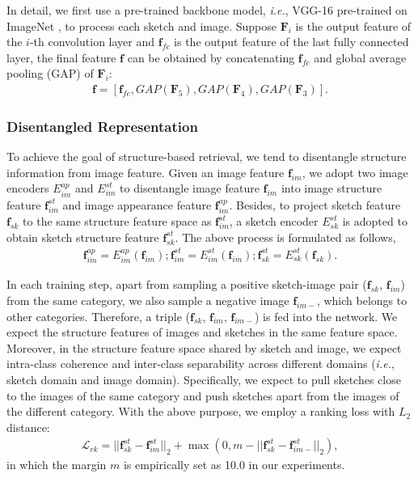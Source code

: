 \documentclass[10pt,twocolumn,letterpaper]{article}
\begin{document}
In detail, we first use a pre-trained backbone model, \emph{i.e.}, VGG-16 pre-trained on ImageNet \cite{deng2009imagenet}, to process each sketch and image. 
Suppose $\mathbf{F}_i$ is the output feature of the $i$-th convolution layer and $\mathbf{f}_{fc}$ is the output feature of the last fully connected layer, the final feature $\mathbf{f}$ can be obtained by concatenating $\mathbf{f}_{fc}$ and global average pooling (GAP) of $\mathbf{F}_i$:
\vspace{-10pt}
\begin{align}
\mathbf{f}\!=\![\mathbf{f}_{fc}, GAP(\mathbf{F}_5), GAP(\mathbf{F}_4), GAP(\mathbf{F}_3)].
\end{align}

\subsubsection{Disentangled Representation}
To achieve the goal of structure-based retrieval, we tend to disentangle structure information from image feature. 
Given an image feature $\mathbf{f}_{im}$, we adopt two image encoders $E_{im}^{ap}$ and $E_{im}^{st}$ to disentangle image feature $\mathbf{f}_{im}$ into image structure feature $\mathbf{f}_{im}^{st}$ and image appearance feature $\mathbf{f}_{im}^{ap}$. Besides, to project sketch feature $\mathbf{f}_{sk}$ to the same structure feature space as $\mathbf{f}_{im}^{st}$, a sketch encoder $E_{sk}^{st}$ is adopted to obtain sketch structure feature $\mathbf{f}_{sk}^{st}$. The above process is formulated as follows,
\vspace{-5pt}
\begin{align}
    \mathbf{f}_{im}^{ap} \!=\! E_{im}^{ap}(\mathbf{f}_{im}); \mathbf{f}_{im}^{st} \!=\! E_{im}^{st}(\mathbf{f}_{im}); \mathbf{f}_{sk}^{st} \!=\! E_{sk}^{st}(\mathbf{f}_{sk}).
\end{align}

In each training step, apart from sampling a positive sketch-image pair ($\mathbf{f}_{sk}$, $\mathbf{f}_{im}$) from the same category, we also sample a negative image $\mathbf{f}_{im-}$, which belongs to other categories. Therefore, a triple ($\mathbf{f}_{sk}$, $\mathbf{f}_{im}$, $\mathbf{f}_{im-}$) is fed into the network. We expect the structure features of images and sketches in the same feature space. Moreover, in the structure feature space shared by sketch and image, we expect intra-class coherence and inter-class separability across different domains (\emph{i.e.}, sketch domain and image domain). Specifically, we expect to pull sketches close to the images of the same category and push sketches apart from the images of the different category. With the above purpose, we employ a ranking loss with $L_2$ distance:
\vspace{-5pt}
\begin{align} \label{eqn:rank_loss}
        \mathcal{L}_{rk} \!=\! ||\mathbf{f}_{sk}^{st}\!-\!\mathbf{f}_{im}^{st}||_{2}\!+\!\max(0,\!m\!-\!||\mathbf{f}_{sk}^{st}\!-\!\mathbf{f}_{im-}^{st}||_{2}),
\end{align}
in which the margin $m$ is empirically set as 10.0 in our experiments.
\end{document}
